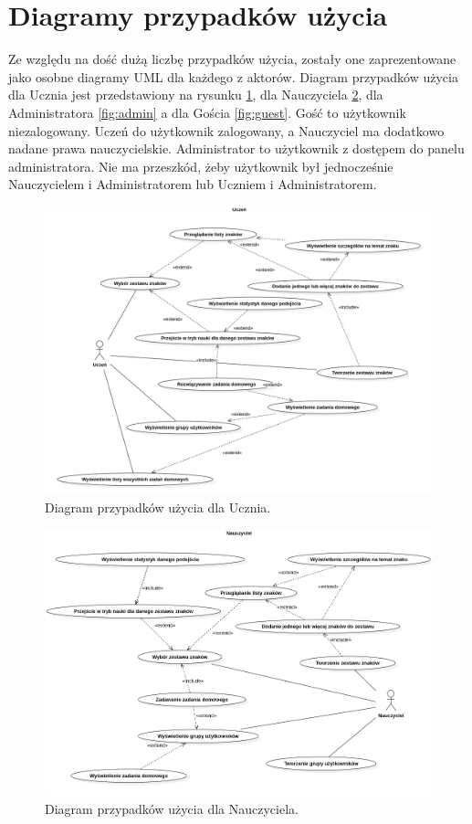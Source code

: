 \documentclass[a4paper,twoside,12pt]{book}
\begin{document}
\section{Diagramy przypadków użycia}
Ze względu na dość dużą liczbę przypadków użycia, zostały one zaprezentowane jako osobne diagramy UML dla każdego z aktorów. Diagram przypadków użycia dla Ucznia jest przedstawiony na rysunku \ref{fig:uczen}, dla Nauczyciela \ref{fig:nauczyciel}, dla Administratora \ref{fig:admin} a dla Gościa \ref{fig:guest}. Gość to użytkownik niezalogowany. Uczeń do użytkownik zalogowany, a Nauczyciel ma dodatkowo nadane prawa nauczycielskie. Administrator to użytkownik z dostępem do panelu administratora. Nie ma przeszkód, żeby użytkownik był jednocześnie Nauczycielem i Administratorem lub Uczniem i Administratorem.
\begin{figure}[]
\centering
\includegraphics[width=\textwidth]{Uczen}
\caption{Diagram przypadków użycia dla Ucznia.}
\label{fig:uczen}
\end{figure}
\begin{figure}[]
\centering
\includegraphics[width=\textwidth]{Nauczyciel}
\caption{Diagram przypadków użycia dla Nauczyciela.}
\label{fig:nauczyciel}
\end{figure}
\end{document}
